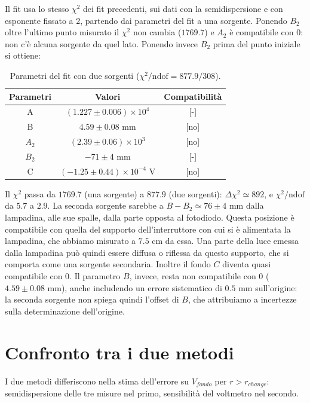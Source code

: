 \documentclass[10pt,twocolumn]{article}
\begin{document}
\noindent Il fit usa lo stesso $\chi^2$ dei fit precedenti, sui dati con la semidispersione e con
esponente fissato a 2, partendo dai parametri del fit a una sorgente. Ponendo $B_2$ oltre l'ultimo punto misurato il $\chi^2$ non cambia
($1769.7$) e $A_2$ è compatibile con 0: non c'è alcuna sorgente da quel lato.
Ponendo invece $B_2$ prima del punto iniziale si ottiene:
\begin{table}[H]
    \centering
    \begin{tabular}{ccc}
        \toprule
        \textbf{Parametri} & \textbf{Valori} & \textbf{Compatibilità} \\
        \midrule
        A & $(1.227 \pm 0.006)\times10^{4}$ & [-] \\
        B & $4.59 \pm 0.08$ mm & [no] \\              %
        $A_2$ & $(2.39 \pm 0.06)\times10^{3}$ & [no] \\ %
        $B_2$ & $-71 \pm 4$ mm & [-] \\
        C & $(-1.25 \pm 0.44)\times10^{-4}$ V & [no] \\ %
        \bottomrule
    \end{tabular}
    \caption{Parametri del fit con due sorgenti ($\chi^2/\mathrm{ndof}=877.9/308$).}
    \label{tab:due_sorgenti}
\end{table}

\noindent Il $\chi^2$ passa da $1769.7$ (una sorgente) a $877.9$ (due sorgenti):
$\Delta\chi^2\simeq 892$, e $\chi^2/\mathrm{ndof}$ da $5.7$ a $2.9$.
La seconda sorgente sarebbe a $B-B_2\simeq 76\pm4$ mm dalla lampadina, alle sue spalle, dalla parte opposta al
fotodiodo. Questa posizione è compatibile con quella del supporto dell'interruttore con
cui si è alimentata la lampadina, che abbiamo misurato a $7.5$ cm da essa. 
Una parte della luce emessa dalla lampadina può quindi essere diffusa o riflessa da questo
supporto, che si comporta come una sorgente secondaria. Inoltre 
il fondo $C$ diventa quasi compatibile con 0. Il parametro $B$, invece, resta
non compatibile con 0 ($4.59\pm0.08$ mm), anche includendo un errore sistematico di $0.5$ mm
sull'origine: la seconda sorgente non spiega quindi l'offset di $B$, che attribuiamo a
incertezze sulla determinazione dell'origine.

\section{Confronto tra i due metodi}
\noindent I due metodi differiscono nella stima dell'errore su $V_{fondo}$ per $r>r_{change}$:
semidispersione delle tre misure nel primo, sensibilità del voltmetro nel secondo.
\end{document}
